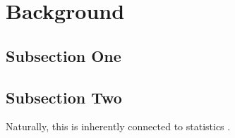 \newpage

\section{Background}

 \lipsum[4]

\subsection{Subsection One}

 \lipsum[5]

\subsection{Subsection Two}

 \lipsum[6] Naturally, this is inherently connected to statistics
\autocite{hastieElementsStatisticalLearning2009}.
